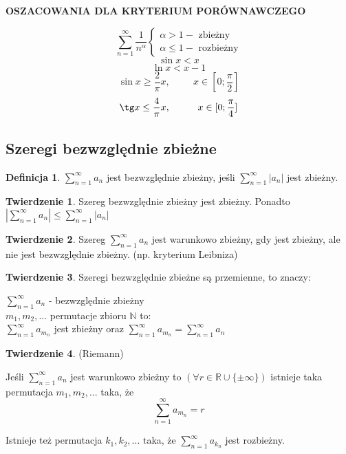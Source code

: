 \documentclass{article}
\theoremstyle{definition}
\newtheorem{de}{Definicja}[subsection]
\theoremstyle{definition}
\newtheorem{tw}{Twierdzenie}[subsection]
\theoremstyle{definition}
\begin{document}
\begin{center}
\textbf{OSZACOWANIA DLA KRYTERIUM PORÓWNAWCZEGO}
\end{center}

$$
\sum_{n=1}^{\infty} \frac{1}{n^{\alpha}}
\begin{cases}
\alpha > 1 -\text{ zbieżny}
\\
\alpha \leq 1 -\text{ rozbieżny}
\end{cases}
$$
$$
\sin x < x
$$
$$
\ln x < x-1
$$
$$
\sin x \geq \frac{2}{\pi}x, \hspace{1cm} x \in [0;\frac{\pi}{2}]
$$
$$
\tg x \leq \frac{4}{\pi}x, \hspace{1cm} x \in [0;\frac{\pi}{4}]
$$

\subsection{Szeregi bezwzględnie zbieżne}

\begin{de}
$ \sum_{n=1}^{\infty}a_n $ jest bezwzględnie zbieżny, jeśli
$ \sum_{n=1}^{\infty}|a_n| $ jest zbieżny.
\end{de}

\begin{tw}
Szereg bezwzględnie zbieżny jest zbieżny. Ponadto
$ |\sum_{n=1}^{\infty}a_n| \leq \sum_{n=1}^{\infty}|a_n| $
\end{tw}

\begin{tw}
Szereg $ \sum_{n=1}^{\infty}a_n $ jest warunkowo zbieżny, gdy jest zbieżny,
ale nie jest bezwzględnie zbieżny. (np. kryterium Leibniza)
\end{tw}

\begin{tw}
Szeregi bezwzględnie zbieżne są przemienne, to znaczy:
\begin{center}
$ \sum_{n=1}^{\infty}a_n $ - bezwzględnie zbieżny\\
$ m_1, m_2, ...$ permutacje zbioru $\mathbb{N}$
to:\\
$ \sum_{n=1}^{\infty}a_{m_n} $ jest zbieżny oraz
$ \sum_{n=1}^{\infty}a_{m_n} = \sum_{n=1}^{\infty}a_n $
\end{center}
\end{tw}

\begin{tw}
(Riemann)

Jeśli $ \sum_{n=1}^{\infty}a_n $ jest warunkowo zbieżny to
$ (\forall r \in \mathbb{R} \cup \{\pm \infty \}) $
istnieje taka permutacja $m_1, m_2, ... $ taka, że
$$ \sum_{n=1}^{\infty}a_{m_n} = r $$

Istnieje też permutacja $k_1, k_2, ... $ taka, że $ \sum_{n=1}^{\infty}a_{k_n} $
jest rozbieżny.

\end{tw}
\end{document}
